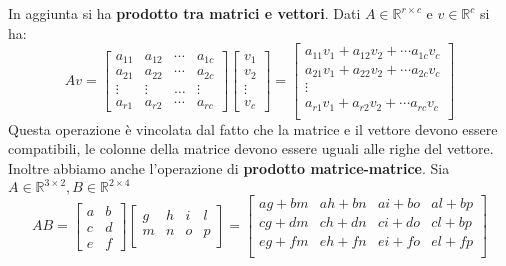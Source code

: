 In aggiunta si ha \textbf{prodotto tra matrici e vettori}. Dati $A\in \mathbb{R}^{r\times c}$
e $v\in \mathbb{R}^{c}$ si ha:
\begin{equation*}
    Av = \left[\begin{array}{cccc}
            a_{11} & a_{12} & \cdots & a_{1c} \\
            a_{21} & a_{22} & \cdots & a_{2c} \\
            \vdots & \vdots & \dots  & \vdots \\
            a_{r1} & a_{r2} & \cdots & a_{rc}
        \end{array}\right] \left[\begin{array}{c}
            v_1 \\v_2\\\vdots\\v_c
        \end{array}\right] = \left[\begin{array}{c}
            a_{11}v_1+a_{12}v_2+\cdots a_{1c}v_c \\
            a_{21}v_1+a_{22}v_2+\cdots a_{2c}v_c \\
            \vdots                               \\
            a_{r1}v_1+a_{r2}v_2+\cdots a_{rc}v_c \\
        \end{array}\right]
\end{equation*}
Questa operazione è vincolata dal fatto che la matrice e il vettore devono
essere compatibili, le colonne della matrice devono essere uguali alle righe del
vettore. Inoltre abbiamo anche l'operazione di \textbf{prodotto matrice-matrice}.
Sia $A\in \mathbb{R}^{3\times 2}, B\in \mathbb{R}^{2\times 4}$
\begin{equation*}
    AB = \left[\begin{array}{cc}
            a & b \\
            c & d \\
            e & f
        \end{array}\right]\left[\begin{array}{cccc}
            g & h & i & l \\
            m & n & o & p \\
        \end{array}\right] = \left[\begin{array}{cccc}
            ag+bm & ah+bn & ai+bo & al+bp \\
            cg+dm & ch+dn & ci+do & cl+bp \\
            eg+fm & eh+fn & ei+fo & el+fp \\
        \end{array}\right]
\end{equation*}
